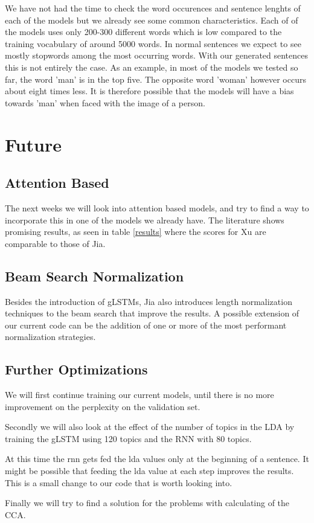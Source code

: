 \documentclass{article}
\begin{document}
We have not had the time to check the word occurences and sentence lenghts of each of the models but we already see some common characteristics. Each of of the models uses only 200-300 different words which is low compared to the training vocabulary of around 5000 words. In normal sentences we expect to see mostly stopwords among the most occurring words. With our generated sentences this is not entirely the case. As an example, in most of the models we tested so far, the word 'man' is in the top five. The opposite word 'woman' however occurs about eight times less. It is therefore possible that the models will have a bias towards 'man' when faced with the image of a person.

\section{Future}
\subsection{Attention Based}
The next weeks we will look into attention based models, and try to find a way to incorporate this in one of the models we already have. The literature shows promising results, as seen in table \ref{results} where the scores for Xu are comparable to those of Jia.

\subsection{Beam Search Normalization}
Besides the introduction of gLSTMs, Jia also introduces length normalization techniques to the beam search that improve the results.
A possible extension of our current code can be the addition of one or more of the most performant normalization strategies.


\subsection{Further Optimizations}
We will first continue training our current models, until there is no more improvement on the perplexity on the validation set.

Secondly we will also look at the effect of the number of topics in the LDA by training the gLSTM using 120 topics and the RNN with 80 topics. 

At this time the rnn gets fed the lda values only at the beginning of a sentence. It might be possible that feeding the lda value at each step improves the results. This is a small change to our code that is worth looking into.

Finally we will try to find a solution for the problems with calculating of the CCA.



\end{document}
